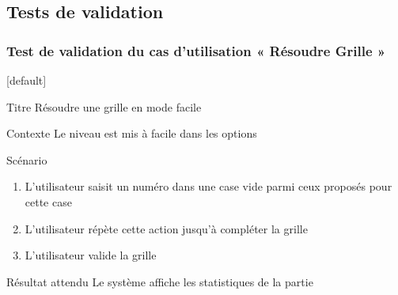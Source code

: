 \documentclass{beamer}
\begin{document}
\subsection{Tests de validation}
\begin{frame}
  \frametitle{Test de validation du cas d'utilisation « Résoudre Grille »}
  [default]
  \begin{block}{\footnotesize{Titre}}
    \scriptsize{Résoudre une grille en mode facile}
  \end{block}
  \pause
  \begin{block}{\footnotesize{Contexte}}
    \scriptsize{Le niveau est mis à facile dans les options}
  \end{block}
  \pause
  \begin{block}{\footnotesize{Scénario}}
    \begin{enumerate}
      [circle]
      \item
        \scriptsize{L'utilisateur saisit un numéro dans une case vide parmi ceux proposés pour cette case}
      \item
        \scriptsize{L’utilisateur répète cette action jusqu’à compléter la grille}
      \item
        \scriptsize{L’utilisateur valide la grille}
    \end{enumerate}
  \end{block}
  \pause
  \begin{block}{\footnotesize{Résultat attendu}}
    \scriptsize{Le système affiche les statistiques de la partie}
  \end{block}
\end{frame}
\end{document}
